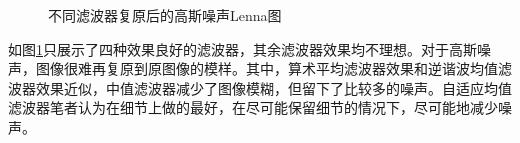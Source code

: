 \documentclass{article}
\begin{document}
\begin{figure}[ht]
{	}
	\quad
	\caption{不同滤波器复原后的高斯噪声Lenna图}
	\label{fig:gao-filter}
\end{figure}

如图\ref{fig:gao-filter}只展示了四种效果良好的滤波器，其余滤波器效果均不理想。对于高斯噪声，图像很难再复原到原图像的模样。其中，算术平均滤波器效果和逆谐波均值滤波器效果近似，中值滤波器减少了图像模糊，但留下了比较多的噪声。自适应均值滤波器笔者认为在细节上做的最好，在尽可能保留细节的情况下，尽可能地减少噪声。
\end{document}
